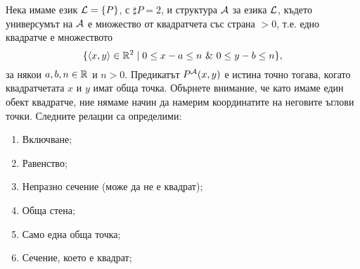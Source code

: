 \begin{problem}
  Нека имаме език $\mathcal{L} = \{P\}$, с $\sharp P = 2$, и структура $\mathcal{A}$ за езика $\mathcal{L}$, където
  универсумът на $\mathcal{A}$ е множество от квадратчета със страна $> 0$, т.е.
  едно квадратче е множеството
  \[\{\langle{x,y}\rangle \in \mathbb{R}^2 \mid 0 \leq x - a \leq n\ \&\ 0 \leq y-b \leq n\},\]
  за някои $a, b, n \in \mathbb{R}$ и $n > 0$.
  Предикатът $P^{\mathcal{A}}(x,y)$ е истина точно тогава, когато квадратчетата $x$ и $y$ имат обща точка.
  Обърнете внимание, че като имаме един обект квадратче, ние нямаме начин да намерим координатите на неговите ъглови точки.
  Следните релации са определими:
  \begin{enumerate}[1)]
  \item
    Включване;
  \item
    Равенство;
  \item
    Непразно сечение (може да не е квадрат);
  \item
    Обща стена;
  \item
    Само една обща точка;
  \item
    Сечение, което е квадрат;
  \end{enumerate}
\end{problem}
